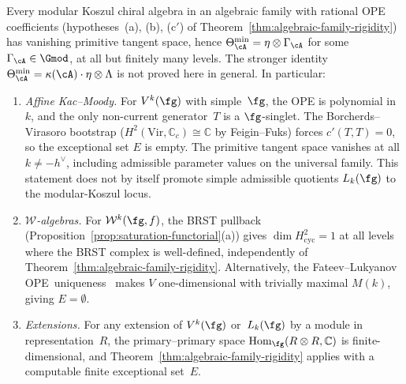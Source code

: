 \begin{corollary}
\label{cor:saturation-algebraic-families}
Every modular Koszul chiral algebra in an algebraic family
with rational OPE coefficients
\textup{(}hypotheses~\textup{(a), (b), (c$'$)} of
Theorem~\textup{\ref{thm:algebraic-family-rigidity}}\textup{)}
has vanishing primitive tangent space, hence
$\Theta_{\cA}^{\min} = \eta \otimes \Gamma_{\cA}$ for some
\/$\Gamma_{\cA}\in\Gmod$, at all but finitely many levels.
The stronger identity
$\Theta_{\cA}^{\min} = \kappa(\cA)\cdot\eta\otimes\Lambda$
is not proved here in general.
In particular:
\begin{enumerate}[label=\textup{(\roman*)}]
\item \emph{Affine Kac--Moody.}  For $V^k(\fg)$ with
  simple~$\fg$, the OPE is polynomial in~$k$, and the
  only non-current generator~$T$ is a $\fg$-singlet.
  The Borcherds--Virasoro bootstrap
  \textup{(}$H^2(\mathrm{Vir}, \mathbb{C}_c) \cong
  \mathbb{C}$ by Feigin--Fuks\textup{)} forces
  $c'(T,T) = 0$, so the exceptional set $E$ is empty.
  The primitive tangent space vanishes at all
  $k \neq -h^\vee$, including admissible parameter values on the
  universal family.
  This statement does not by itself promote simple admissible
  quotients $L_k(\fg)$ to the modular-Koszul locus.
\item \emph{$\mathcal{W}$-algebras.}
  For $\mathcal{W}^k(\fg,f)$, the BRST pullback
  \textup{(}Proposition~\textup{\ref{prop:saturation-functorial}(a)}\textup{)}
  gives $\dim H^2_{\mathrm{cyc}} = 1$ at all levels where
  the BRST complex is well-defined, independently of
  Theorem~\textup{\ref{thm:algebraic-family-rigidity}}.
  Alternatively, the Fateev--Lukyanov
  OPE~uniqueness~\textup{\cite{FL88}} makes $V$ one-dimensional
  with trivially maximal $M(k)$, giving $E = \emptyset$.
\item \emph{Extensions.}  For any extension of $V^k(\fg)$
  or~$L_k(\fg)$ by a module in representation~$R$, the
  primary--primary space $\operatorname{Hom}_\fg(R \otimes R, \mathbb{C})$ is
  finite-dimensional, and
  Theorem~\textup{\ref{thm:algebraic-family-rigidity}} applies
  with a computable finite exceptional set~$E$.
\end{enumerate}
\end{corollary}

